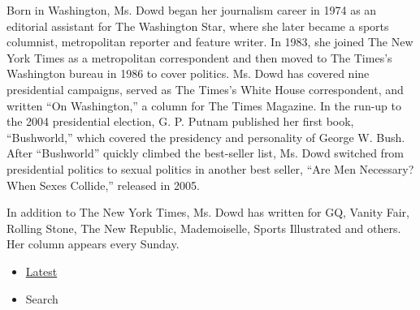 Born in Washington, Ms. Dowd began her journalism career in 1974 as an
editorial assistant for The Washington Star, where she later became a
sports columnist, metropolitan reporter and feature writer. In 1983, she
joined The New York Times as a metropolitan correspondent and then moved
to The Times's Washington bureau in 1986 to cover politics. Ms. Dowd has
covered nine presidential campaigns, served as The Times's White House
correspondent, and written ``On Washington,'' a column for The Times
Magazine. In the run-up to the 2004 presidential election, G. P. Putnam
published her first book, ``Bushworld,'' which covered the presidency
and personality of George W. Bush. After ``Bushworld'' quickly climbed
the best-seller list, Ms. Dowd switched from presidential politics to
sexual politics in another best seller, ``Are Men Necessary? When Sexes
Collide,'' released in 2005.

In addition to The New York Times, Ms. Dowd has written for GQ, Vanity
Fair, Rolling Stone, The New Republic, Mademoiselle, Sports Illustrated
and others. Her column appears every Sunday.

\begin{itemize}
\tightlist
\item
  \protect\hyperlink{stream-panel}{Latest}
\item
  Search
\end{itemize}

